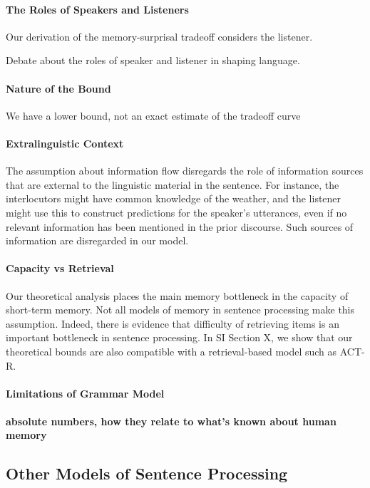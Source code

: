 \paragraph{The Roles of Speakers and Listeners}
Our derivation of the memory-surprisal tradeoff considers the listener.

Debate about the roles of speaker and listener in shaping language.


\paragraph{Nature of the Bound}
We have a lower bound, not an exact estimate of the tradeoff curve

\paragraph{Extralinguistic Context}
The assumption about information flow disregards the role of information sources that are external to the linguistic material in the sentence.
For instance, the interlocutors might have common knowledge of the weather, and the listener might use this to construct predictions for the speaker's utterances, even if no relevant information has been mentioned in the prior discourse.
Such sources of information are disregarded in our model.

\paragraph{Capacity vs Retrieval}
Our theoretical analysis places the main memory bottleneck in the capacity of short-term memory.
Not all models of memory in sentence processing make this assumption.
Indeed, there is evidence that difficulty of retrieving items is an important bottleneck in sentence processing.
In SI Section X, we show that our theoretical bounds are also compatible with a retrieval-based model such as ACT-R.


\paragraph{Limitations of Grammar Model}

\paragraph{absolute numbers, how they relate to what's known about human memory}

\subsection{Other Models of Sentence Processing}

